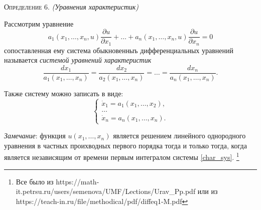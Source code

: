 \textsc{Определение 6.}
\textit{(Уравнения характеристик)}

Рассмотрим уравнение
\begin{equation*}
	a_1(x_1, \dotsc, x_n, u) \frac{\partial u}{\partial x_1} + \dotsc + a_n(x_1, \dotsc, x_n, u) \frac{\partial u}{\partial x_n} = 0
\end{equation*}
сопоставленная ему система обыкновенныъ дифференциальных уравнений называется \textit{системой уравнений характеристик}
\begin{equation}
	\frac{d x_1}{a_1(x_1, \dotsc, x_n)} = \frac{d x_2}{a_2(x_1, \dotsc, x_n)} = \dotsc = \frac{d x_n}{a_n(x_1, \dotsc, x_n)}.
\end{equation}

Также систему можно записать в виде:
\begin{equation}  \label{char_sys}
	\begin{cases}
		\dot{x}_1 = a_1(x_1, \dotsc, x_2), \\
		\dotsc \\
		\dot{x}_n = a_n(x_1, \dotsc, x_n).
	\end{cases} \tag{5'}
\end{equation}

\textit{Замечание}: функция $ u(x_1, \dotsc, x_n) $ является решением линейного однородного уравнения в частных проихводных первого порядка тогда и только тогда, когда является независящим от времени первым интегралом системы \eqref{char_sys}. \footnote{Все было из https://math-it.petrsu.ru/users/semenova/UMF/Lections/Urav\_Pp.pdf 
	или из https://teach-in.ru/file/methodical/pdf/diffeq1-M.pdf
}